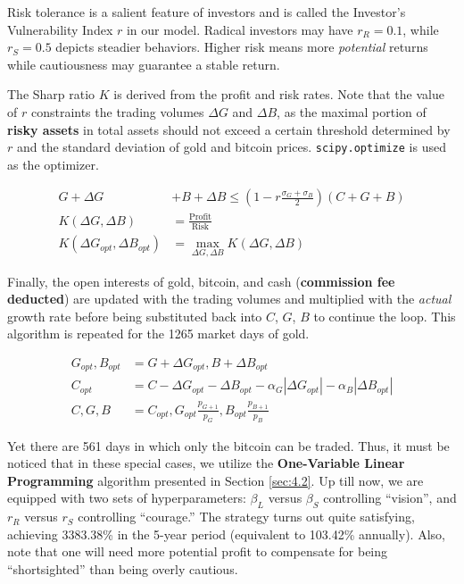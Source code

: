 \documentclass{mcmthesis}
\begin{document}
{	Risk tolerance is a salient feature of investors and is called the Investor's Vulnerability Index $r$ in our model. Radical investors may have $r_R=0.1$, while $r_S=0.5$ depicts steadier behaviors. Higher risk means more \textit{potential} returns while cautiousness may guarantee a stable return. 
	
	The Sharp ratio $K$ is derived from the profit and risk rates. Note that the value of $r$ constraints the trading volumes $\Delta G$ and $\Delta B$, as the maximal portion of \textbf{risky assets} in total assets should not exceed a certain threshold determined by $r$ and the standard deviation of gold and bitcoin prices. \verb|scipy.optimize| is used as the optimizer. 
	
	\begin{align}
		G+\Delta G&+B+\Delta B \le (1-r\frac{\sigma_G+\sigma_B}{2})\left(C+G+B\right) \\
		K\left(\Delta G, \Delta B\right) & = \frac {\textrm{Profit}} {\textrm{Risk}} \\
		K\left(\Delta G_{opt}, \Delta B_{opt}\right) & = \mathop{\max}_{\Delta G, \Delta B} K\left(\Delta G, \Delta B\right)
	\end{align}
	
	Finally, the open interests of gold, bitcoin, and cash (\textbf{commission fee deducted}) are updated with the trading volumes and multiplied with the \textit{actual} growth rate before being substituted back into $C$, $G$, $B$ to continue the loop. This algorithm is repeated for the 1265 market days of gold. 
	
	\begin{align}
		G_{opt}, B_{opt} & = G + \Delta G_{opt}, B + \Delta B_{opt} \\
		C_{opt} & = C-\Delta G_{opt}-\Delta B_{opt}-\alpha_G\left|\Delta G_{opt}\right|-\alpha_B\left|\Delta B_{opt}\right| \\
		C, G, B & = C_{opt}, G_{opt} \frac{p_{G+1}}{p_G}, B_{opt} \frac{p_{B+1}}{p_B}
	\end{align}
	
	Yet there are 561 days in which only the bitcoin can be traded. Thus, it must be noticed that in these special cases, we utilize the \textbf{One-Variable Linear Programming} algorithm presented in Section \ref{sec:4.2}. Up till now, we are equipped with two sets of hyperparameters: $\beta_L$ versus $\beta_S$ controlling ``vision'', and $r_R$ versus $r_S$ controlling ``courage.'' The strategy turns out quite satisfying, achieving 3383.38\% in the 5-year period (equivalent to 103.42\% annually). Also, note that one will need more potential profit to compensate for being ``shortsighted'' than being overly cautious. 
	
}
\end{document}
